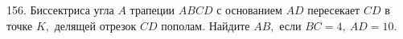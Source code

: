 156. Биссектриса угла $A$ трапеции $ABCD$ с основанием $AD$ пересекает $CD$ в точке $K,$ делящей отрезок $CD$ пополам. Найдите $AB,$ если $BC=4,\ AD=10.$\\
